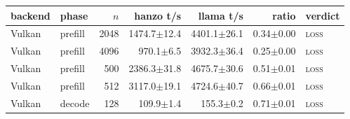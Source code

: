 \begin{tabular}{@{}llrrrrl@{}}
\toprule
backend & phase & $n$ & hanzo t/s & llama t/s & ratio & verdict \\
\midrule
Vulkan & prefill & 2048 & 1474.7$\pm$12.4 & 4401.1$\pm$26.1 & 0.34$\pm$0.00 & \textsc{loss} \\
Vulkan & prefill & 4096 & 970.1$\pm$6.5 & 3932.3$\pm$36.4 & 0.25$\pm$0.00 & \textsc{loss} \\
Vulkan & prefill & 500 & 2386.3$\pm$31.8 & 4675.7$\pm$30.6 & 0.51$\pm$0.01 & \textsc{loss} \\
Vulkan & prefill & 512 & 3117.0$\pm$19.1 & 4724.6$\pm$40.7 & 0.66$\pm$0.01 & \textsc{loss} \\
Vulkan & decode & 128 & 109.9$\pm$1.4 & 155.3$\pm$0.2 & 0.71$\pm$0.01 & \textsc{loss} \\
\bottomrule
\end{tabular}
